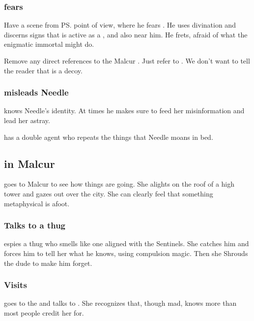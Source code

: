 \begin{garbage}
\subsubsection[Psyrex fears Ishnaruchaefir]{\Psyrex{} fears \Ishna}
Have a scene from \ps{\Psyrex}{} point of view, where he fears \Ishna. He uses divination and discerns signs that \Ishnaruchaefir{} is active as a \vertex, and also near him. He frets, afraid of what the enigmatic immortal might do.

Remove any direct references to the Malcur \nexus. 
Just refer to . 
We don't want to tell the reader that \Forklin{} is a decoy. 





\subsubsection[Psyrex misleads Needle]{\Psyrex{} misleads Needle}
\Psyrex{} knows Needle's identity. At times he makes sure to feed her misinformation and lead her astray. 

\Psyrex{} has a double agent who repeats the things that Needle moans in bed. 









\subsection{\Criseis{} in Malcur}
\Criseis{} goes to Malcur to see how things are going. 
She alights on the roof of a high tower and gazes out over the city. 
She can clearly feel that something metaphysical is afoot. 





\subsubsection{Talks to a thug}
\Criseis{} espies a thug who smells like one aligned with the Sentinels. 
She catches him and forces him to tell her what he knows, using compulsion magic. 
Then she Shrouds the dude to make him forget. 





\subsubsection{Visits \Uswa}
\Criseis{} goes to the  and talks to \hs{\Uswa}. 
She recognizes that, though mad, \Uswa{} knows more than most people credit her for. 


\end{garbage}
